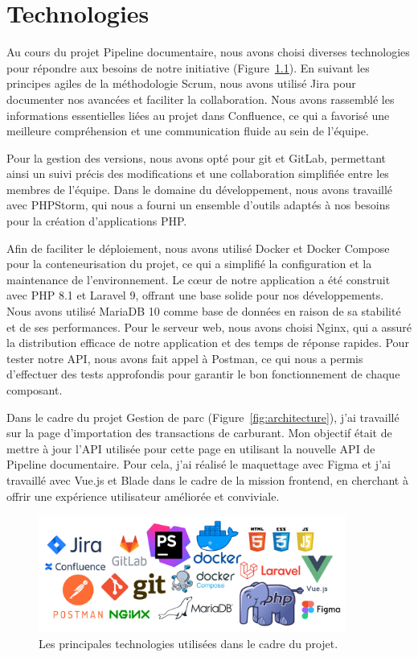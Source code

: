 \chapter{Technologies}\label{ch:technologies}

Au cours du projet Pipeline documentaire, nous avons choisi diverses technologies pour répondre aux besoins de notre initiative (Figure~\ref{fig:technologies}). En suivant les principes agiles de la méthodologie Scrum, nous avons utilisé Jira pour documenter nos avancées et faciliter la collaboration. Nous avons rassemblé les informations essentielles liées au projet dans Con\-flu\-ence, ce qui a favorisé une meilleure compréhension et une communication fluide au sein de l'équipe.

Pour la gestion des versions, nous avons opté pour git et GitLab, permettant ainsi un suivi précis des modifications et une collaboration simplifiée entre les membres de l'équipe. Dans le domaine du développement, nous avons travaillé avec PHP\-Storm, qui nous a fourni un ensemble d'outils adaptés à nos besoins pour la création d'applications PHP.

Afin de faciliter le déploiement, nous avons utilisé Docker et Docker Compose pour la conteneurisation du projet, ce qui a simplifié la configuration et la maintenance de l'environnement. Le cœur de notre application a été construit avec PHP 8.1 et Laravel 9, offrant une base solide pour nos développements. Nous avons utilisé MariaDB 10 comme base de données en raison de sa stabilité et de ses performances. Pour le serveur web, nous avons choisi Nginx, qui a assuré la distribution efficace de notre application et des temps de réponse rapides. Pour tester notre API, nous avons fait appel à Postman, ce qui nous a permis d'effectuer des tests approfondis pour garantir le bon fonctionnement de chaque composant.

Dans le cadre du projet Gestion de parc (Figure~\ref{fig:architecture}), j'ai travaillé sur la page d'importation des transactions de carburant. Mon objectif était de mettre à jour l'API utilisée pour cette page en utilisant la nouvelle API de Pipeline documentaire. Pour cela, j'ai réalisé le maquettage avec Figma et j'ai travaillé avec Vue.js et Blade dans le cadre de la mission frontend, en cherchant à offrir une expérience utilisateur améliorée et conviviale.

\begin{figure}[ht]
    \centering
    \includegraphics[width=0.9\textwidth]{img/technologies01}
    \caption{Les principales technologies utilisées dans le cadre du projet.}
    \label{fig:technologies}
\end{figure}